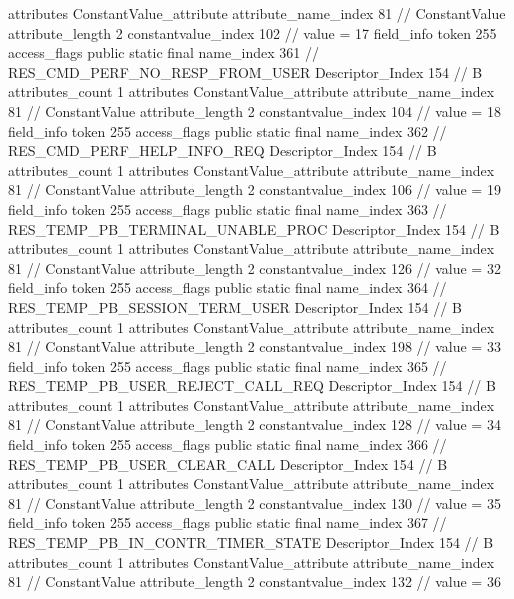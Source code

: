 {{{{{				attributes {
				ConstantValue_attribute {
					attribute_name_index	81		// ConstantValue
					attribute_length	2
					constantvalue_index	102		// value = 17
				}
				}
			}
			field_info {
				token	255
				access_flags	public static final
				name_index	361		// RES_CMD_PERF_NO_RESP_FROM_USER
				Descriptor_Index	154		// B
				attributes_count	1
				attributes {
				ConstantValue_attribute {
					attribute_name_index	81		// ConstantValue
					attribute_length	2
					constantvalue_index	104		// value = 18
				}
				}
			}
			field_info {
				token	255
				access_flags	public static final
				name_index	362		// RES_CMD_PERF_HELP_INFO_REQ
				Descriptor_Index	154		// B
				attributes_count	1
				attributes {
				ConstantValue_attribute {
					attribute_name_index	81		// ConstantValue
					attribute_length	2
					constantvalue_index	106		// value = 19
				}
				}
			}
			field_info {
				token	255
				access_flags	public static final
				name_index	363		// RES_TEMP_PB_TERMINAL_UNABLE_PROC
				Descriptor_Index	154		// B
				attributes_count	1
				attributes {
				ConstantValue_attribute {
					attribute_name_index	81		// ConstantValue
					attribute_length	2
					constantvalue_index	126		// value = 32
				}
				}
			}
			field_info {
				token	255
				access_flags	public static final
				name_index	364		// RES_TEMP_PB_SESSION_TERM_USER
				Descriptor_Index	154		// B
				attributes_count	1
				attributes {
				ConstantValue_attribute {
					attribute_name_index	81		// ConstantValue
					attribute_length	2
					constantvalue_index	198		// value = 33
				}
				}
			}
			field_info {
				token	255
				access_flags	public static final
				name_index	365		// RES_TEMP_PB_USER_REJECT_CALL_REQ
				Descriptor_Index	154		// B
				attributes_count	1
				attributes {
				ConstantValue_attribute {
					attribute_name_index	81		// ConstantValue
					attribute_length	2
					constantvalue_index	128		// value = 34
				}
				}
			}
			field_info {
				token	255
				access_flags	public static final
				name_index	366		// RES_TEMP_PB_USER_CLEAR_CALL
				Descriptor_Index	154		// B
				attributes_count	1
				attributes {
				ConstantValue_attribute {
					attribute_name_index	81		// ConstantValue
					attribute_length	2
					constantvalue_index	130		// value = 35
				}
				}
			}
			field_info {
				token	255
				access_flags	public static final
				name_index	367		// RES_TEMP_PB_IN_CONTR_TIMER_STATE
				Descriptor_Index	154		// B
				attributes_count	1
				attributes {
				ConstantValue_attribute {
					attribute_name_index	81		// ConstantValue
					attribute_length	2
					constantvalue_index	132		// value = 36
}}}}}}}
